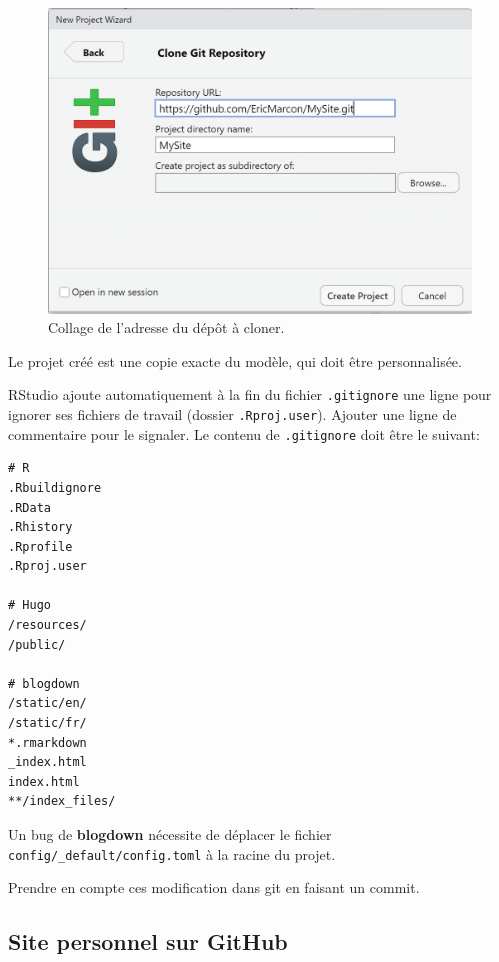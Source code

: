\documentclass[
  11pt,
  french,
  a4paper,
  extrafontsizes,onecolumn,openright
  ]{memoir}
\begin{document}
\scriptsize

\begin{figure}

{\centering \includegraphics[width=0.8\linewidth]{images/rediger-Projet-GitHub} 

}

\caption{Collage de l'adresse du dépôt à cloner.}\label{fig:rediger-Projet-GitHub}
\end{figure}

\normalsize

Le projet créé est une copie exacte du modèle, qui doit être personnalisée.

RStudio ajoute automatiquement à la fin du fichier \texttt{.gitignore} une ligne pour ignorer ses fichiers de travail (dossier \texttt{.Rproj.user}).
Ajouter une ligne de commentaire pour le signaler.
Le contenu de \texttt{.gitignore} doit être le suivant:

\begin{verbatim}
# R
.Rbuildignore
.RData
.Rhistory
.Rprofile
.Rproj.user

# Hugo
/resources/
/public/

# blogdown
/static/en/
/static/fr/
*.rmarkdown
_index.html
index.html
**/index_files/
\end{verbatim}

Un bug de \textbf{blogdown} nécessite de déplacer le fichier \texttt{config/\_default/config.toml} à la racine du projet.

Prendre en compte ces modification dans git en faisant un commit.

\hypertarget{site-personnel-sur-github}{%
\subsection{Site personnel sur GitHub}\label{site-personnel-sur-github}}
\end{document}
